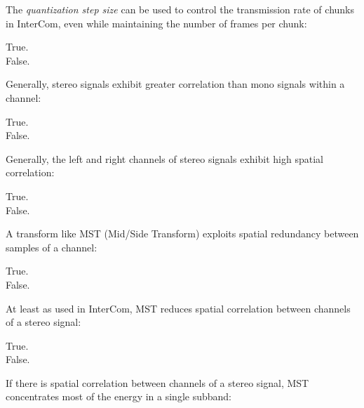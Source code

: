 \documentclass[legalpaper, 12pt, addpoints]{exam}
\begin{document}
\begin{questions}
\question The \emph{quantization step size} can be used to control the transmission rate of chunks in InterCom, even while maintaining the number of frames per chunk:

\begin{oneparchoices}
  \choice True.\\
  \choice False.
\end{oneparchoices}
  
\vspace{0.10in}

\question Generally, stereo signals exhibit greater correlation than mono signals within a channel:

\begin{oneparchoices}
  \choice True.\\
  \choice False.
\end{oneparchoices}
  
\vspace{0.10in}

\question Generally, the left and right channels of stereo signals exhibit high spatial correlation:

\begin{oneparchoices}
  \choice True.\\
  \choice False.
\end{oneparchoices}
  
\vspace{0.10in}

\question A transform like MST (Mid/Side Transform) exploits spatial redundancy between samples of a channel:

\begin{oneparchoices}
  \choice True.\\
  \choice False.
\end{oneparchoices}
  
\vspace{0.10in}

\question At least as used in InterCom, MST reduces spatial correlation between channels of a stereo signal:

\begin{oneparchoices}
  \choice True.\\
  \choice False.
\end{oneparchoices}
  
\vspace{0.10in}

\question If there is spatial correlation between channels of a stereo signal, MST concentrates most of the energy in a single subband:


\end{questions}
\end{document}
